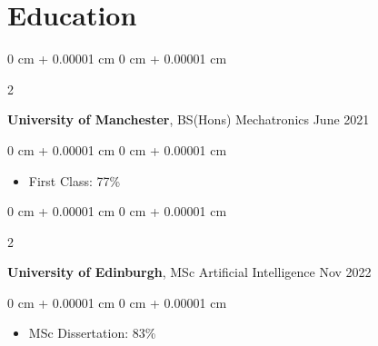 \documentclass[10pt, letterpaper]{article}
\newenvironment{highlights}{
    \begin{itemize}[
        topsep=0.10 cm,
        parsep=0.10 cm,
        partopsep=0pt,
        itemsep=0pt,
        leftmargin=0 cm + 10pt
    ]
}{
    \end{itemize}
} %
\newenvironment{onecolentry}{
    \begin{adjustwidth}{
        0 cm + 0.00001 cm
    }{
        0 cm + 0.00001 cm
    }
}{
    \end{adjustwidth}
} %
\newenvironment{twocolentry}[2][]{
    \onecolentry
    \def\secondColumn{#2}
    \setcolumnwidth{\fill, 4.5 cm}
    \begin{paracol}{2}
}{
    \switchcolumn \raggedleft \secondColumn
    \end{paracol}
    \endonecolentry
} %
\begin{document}
    \section{Education}



        
        \begin{twocolentry}{
            June 2021
        }
            \textbf{University of Manchester}, BS(Hons) Mechatronics\end{twocolentry}

        \vspace{0.10 cm}
        \begin{onecolentry}
            \begin{highlights}
                \item First Class: 77\%
            \end{highlights}
        \end{onecolentry}
        
        \vspace{0.10 cm}
        
        \begin{twocolentry}{
            Nov 2022
        }
            \textbf{University of Edinburgh}, MSc Artificial Intelligence\end{twocolentry}

        \vspace{0.10 cm}
        \begin{onecolentry}
            \begin{highlights}
                \item MSc Dissertation: 83\%
            \end{highlights}
        \end{onecolentry}
    



        

            
\end{document}
